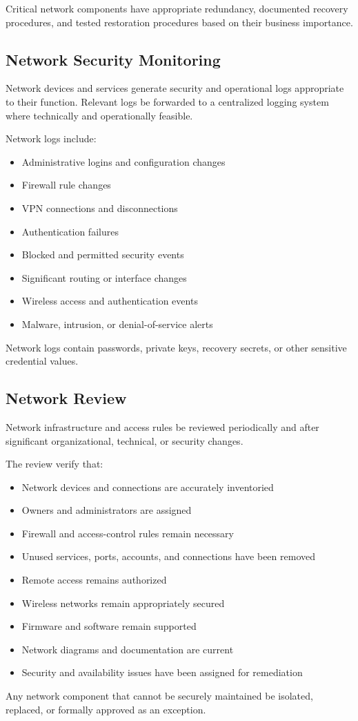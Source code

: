 Critical network components \should{} have appropriate redundancy, documented recovery procedures, and tested restoration procedures based on their business importance.

\subsection{Network Security Monitoring}

Network devices and services \must{} generate security and operational logs appropriate to their function. Relevant logs \should{} be forwarded to a centralized logging system where technically and operationally feasible.

Network logs \should{} include:
\begin{itemize}
    \item Administrative logins and configuration changes
    \item Firewall rule changes
    \item VPN connections and disconnections
    \item Authentication failures
    \item Blocked and permitted security events
    \item Significant routing or interface changes
    \item Wireless access and authentication events
    \item Malware, intrusion, or denial-of-service alerts
\end{itemize}

Network logs \mustnot{} contain passwords, private keys, recovery secrets, or other sensitive credential values.

\subsection{Network Review}

Network infrastructure and access rules \must{} be reviewed periodically and after significant organizational, technical, or security changes.

The review \should{} verify that:
\begin{itemize}
    \item Network devices and connections are accurately inventoried
    \item Owners and administrators are assigned
    \item Firewall and access-control rules remain necessary
    \item Unused services, ports, accounts, and connections have been removed
    \item Remote access remains authorized
    \item Wireless networks remain appropriately secured
    \item Firmware and software remain supported
    \item Network diagrams and documentation are current
    \item Security and availability issues have been assigned for remediation
\end{itemize}

Any network component that cannot be securely maintained \must{} be isolated, replaced, or formally approved as an exception.